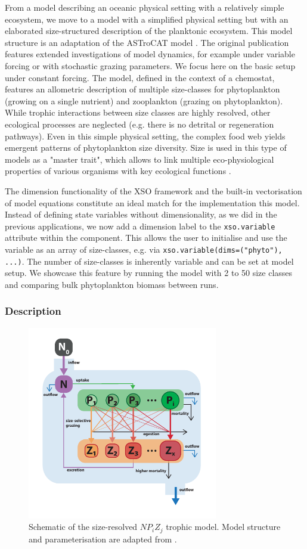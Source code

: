 \documentclass[journal abbreviation, manuscript]{copernicus}
\begin{document}
From a model describing an oceanic physical setting with a relatively simple ecosystem, we move to a model with a simplified physical setting but with an elaborated size-structured description of the planktonic ecosystem. This model structure is an adaptation of the ASTroCAT model \citep{Banas2011b}. The original publication features extended investigations of model dynamics, for example under variable forcing or with stochastic grazing parameters. We focus here on the basic setup under constant forcing. The model, defined in the context of a chemostat, features an allometric description of multiple size-classes for phytoplankton (growing on a single nutrient) and zooplankton (grazing on phytoplankton). While trophic interactions between size classes are highly resolved, other ecological processes are neglected (e.g. there is no detrital or regeneration pathways). Even in this simple physical setting, the complex food web yields emergent patterns of phytoplankton size diversity. Size is used in this type of models as a "master trait", which allows to link multiple eco-physiological properties of various organisms with key ecological functions \citep{Litchman2008}. 

The dimension functionality of the XSO framework and the built-in vectorisation of model equations constitute an ideal match for the implementation this model. Instead of defining state variables without dimensionality, as we did in the previous applications, we now add a dimension label to the \texttt{xso.variable} attribute within the component. This allows the user to initialise and use the variable as an array of size-classes, e.g. via \texttt{xso.variable(dims=("phyto"), ...)}. The number of size-classes is inherently variable and can be set at model setup. We showcase this feature by running the model with 2 to 50 size classes and comparing bulk phytoplankton biomass between runs.

\subsubsection{Description}
\begin{figure}[t]
\includegraphics[width=8.3cm]{Figures/firstdraft_schematics/03_schematics_ASTroCAT.pdf}
\caption{Schematic of the size-resolved $NP_{i}Z_{j}$ trophic model. Model structure and parameterisation are adapted from \citet{Banas2011b}.}
\label{Figure:ModelSchematics_3}
\end{figure}
\end{document}
